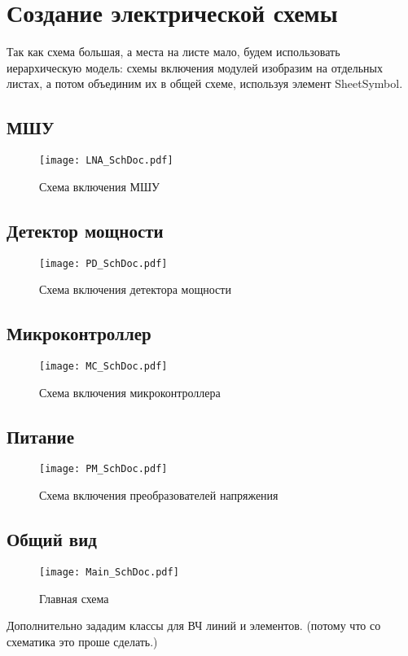 \chapter{Создание электрической схемы} \label{chap:altium-SchDoc}

Так как схема большая, а места на листе мало, будем использовать иерархическую модель: схемы включения модулей изобразим на отдельных листах, а потом объединим их в общей схеме, используя элемент SheetSymbol.
\section{МШУ}

\begin{figure}[H]
	\centering
	\texttt{[image: LNA\_SchDoc.pdf]}
	\caption{Схема включения МШУ}%
	\label{fig:LNA-SchDoc}
\end{figure}

\section{Детектор мощности}

\begin{figure}[H]
	\centering
	\texttt{[image: PD\_SchDoc.pdf]}
	\caption{Схема включения детектора мощности}%
	\label{fig:PD-SchDoc}
\end{figure}

\section{Микроконтроллер}

\begin{figure}[H]
	\centering
	\texttt{[image: MC\_SchDoc.pdf]}
	\caption{Схема включения микроконтроллера}%
	\label{fig:MC-SchDoc}
\end{figure}

\section{Питание}

\begin{figure}[H]
	\centering
	\texttt{[image: PM\_SchDoc.pdf]}
	\caption{Схема включения преобразователей напряжения}%
	\label{fig:PM-SchDoc}
\end{figure}

\section{Общий вид}

\begin{figure}[H]
	\centering
	\texttt{[image: Main\_SchDoc.pdf]}
	\caption{Главная схема}%
	\label{fig:Main_SchDoc}
\end{figure}

Дополнительно зададим классы для ВЧ линий и элементов. (потому что со схематика это проше сделать.)